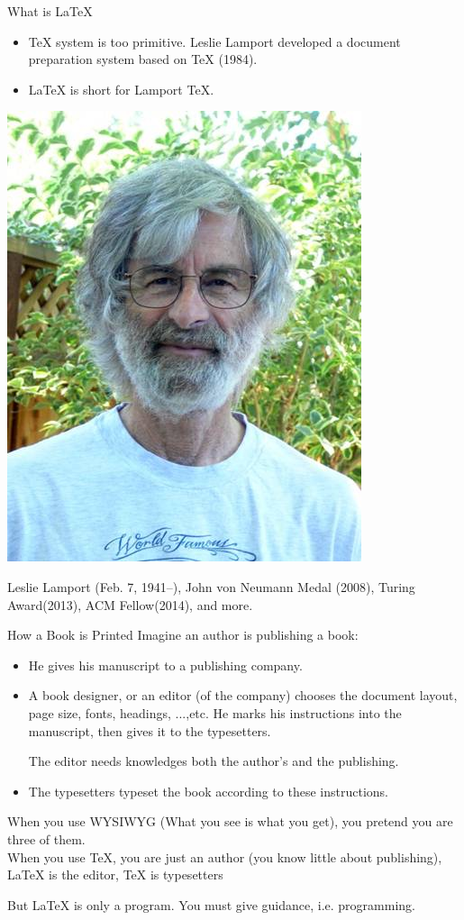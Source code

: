 \documentclass[10pt]{beamer}
\begin{document}
\begin{frame}{What is \LaTeX}
\begin{itemize}
    \item \TeX{} system is too primitive. Leslie Lamport developed a document
    preparation system based on \TeX{} (1984).

\item \LaTeX{} is short for \alert{La}mport \alert{TeX{}}.
\end{itemize}
\begin{center}
    \includegraphics[width=.4\textwidth]{Leslie-Lamport.jpg}
\end{center}
    Leslie Lamport (Feb. 7, 1941--),
    John von Neumann Medal (2008),
    Turing Award(2013), ACM Fellow(2014), and more.
\end{frame}

\begin{frame}[t]{How a Book is Printed}
Imagine an author is publishing a book:
\begin{itemize}
    \item He gives his manuscript to a publishing company.
    \item A book designer, or an editor (of the company) chooses
        the document layout, page size, fonts, headings, ...,etc.
        He marks his instructions into the manuscript, then gives
        it to the typesetters.

        The editor needs knowledges both the author's and the publishing.
    \item The typesetters typeset the book according to these instructions.
\end{itemize}

    When you use WYSIWYG (\alert{What you see is what you get}),
    you pretend you are three of them.\\[10pt]

    When you use \TeX{}, you are just an author (you know little
    about publishing), \LaTeX{} is the editor, \TeX{} is typesetters

    But \LaTeX{} is only a program. You must give guidance, i.e.
    programming.
\end{frame}
\end{document}
